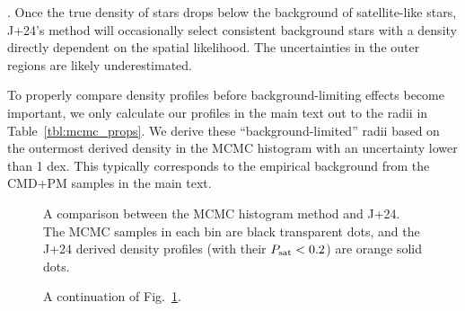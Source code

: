 . Once the true density of stars drops below the background of
satellite-like stars, J+24's method will occasionally select consistent
background stars with a density directly dependent on the spatial
likelihood. The uncertainties in the outer regions are likely
underestimated.

To properly compare density profiles before background-limiting effects
become important, we only calculate our profiles in the main text out to
the radii in Table~\ref{tbl:mcmc_props}. We derive these
``background-limited'' radii based on the outermost derived density in
the MCMC histogram with an uncertainty lower than 1 dex. This typically
corresponds to the empirical background from the CMD+PM samples in the
main text.

\begin{figure}
\centering
{}
\caption[Probabilistic density profiles]{A comparison between the MCMC
histogram method and J+24. The MCMC samples in each bin are black
transparent dots, and the J+24 derived density profiles (with their
\(P_{\rm sat} < 0.2\)) are orange solid dots.}\label{fig:mcmc_hists}
\end{figure}

\begin{figure}
\centering
{}
\caption[Probabilistic density profiles continued]{A continuation of
Fig.~\ref{fig:mcmc_hists}.}\label{fig:mcmc_hists2}
\end{figure}
